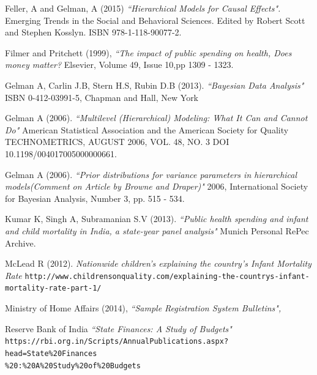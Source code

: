 \documentclass{article}
\begin{document}
\begin{thebibliography}{9}
Feller, A and Gelman, A (2015) \textit{``Hierarchical Models for Causal Effects".}
Emerging Trends in the Social and Behavioral Sciences. Edited by Robert Scott and Stephen Kosslyn. ISBN 978-1-118-90077-2.

Filmer and Pritchett (1999),
\textit{``The impact of public spending on health, Does money matter?}
Elsevier, Volume 49, Issue 10,pp 1309 - 1323.

Gelman A, Carlin J.B, Stern H.S, Rubin D.B (2013).
\textit{``Bayesian Data Analysis"}
ISBN 0-412-03991-5, Chapman and Hall, New York

Gelman A (2006).
\textit{``Multilevel (Hierarchical) Modeling: What It Can and Cannot Do"}
American Statistical Association and the American Society for Quality TECHNOMETRICS, AUGUST 2006, VOL. 48, NO. 3 DOI 10.1198/004017005000000661.

Gelman A (2006).
\textit{``Prior distributions for variance parameters in hierarchical models(Comment on Article by Browne and Draper)"}
2006, International Society for Bayesian Analysis, Number 3, pp. 515 - 534.

Kumar K, Singh A, Subramanian S.V (2013).
\textit{``Public health spending and infant and child mortality in India, a state-year panel analysis"}
Munich Personal RePec Archive.

McLead R (2012).
\textit{Nationwide children's explaining the country's Infant Mortality Rate}
\texttt{http://www.childrensonquality.com/explaining-the-countrys-infant-mortality-rate-part-1/}

Ministry of Home Affairs (2014),
\textit{``Sample Registration System Bulletins",}

Reserve Bank of India
\textit{``State Finances: A Study of Budgets"}
\texttt{https://rbi.org.in/Scripts/AnnualPublications.aspx?head=State\%20Finances\\
\%20:\%20A\%20Study\%20of\%20Budgets}


\end{thebibliography}
\end{document}
